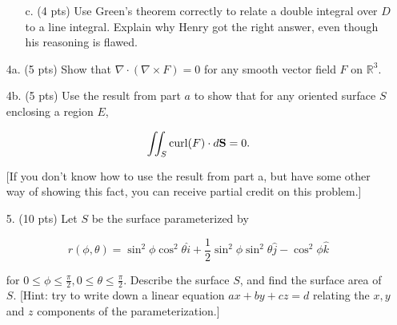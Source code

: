 \documentclass[12 pt]{report}
\begin{document}
\begin{enumerate}
\begin{enumerate}
\vspace{3cm} 

\item[c.] (4 pts) Use Green's theorem correctly to relate a double integral over $D$ to a line integral. Explain why Henry got the right answer, even though his reasoning is flawed. 



\end{enumerate} 

\newpage

\item[4a.] (5 pts) Show that $\nabla \cdot (\nabla \times F) = 0$ for any smooth vector field $F$ on $\mathbb{R}^3$.  

\vspace{10cm}

\item[4b.] (5 pts) Use the result from part $a$ to show that for any oriented surface $S$ enclosing a region $E$,

$$\iint_S \text{curl}(F) \cdot d\bold{S} = 0.$$ 

[If you don't know how to use the result from part a, but have some other way of showing this fact, you can receive partial credit on this problem.]

\newpage

\item[5.] (10 pts) Let $S$ be the surface parameterized by 

$$r(\phi, \theta) = \sin^2 \phi \cos^2 \theta \hat{i} + \frac{1}{2} \sin^2 \phi \sin^2\theta \hat{j}-\cos^2\phi\hat{k}$$

for $0 \leq \phi \leq \frac{\pi}{2}, 0 \leq \theta \leq \frac{\pi}{2}$. Describe the surface $S$, and find the surface area of $S$. [Hint: try to write down a linear equation $ax+by+cz = d$ relating the $x,y$ and $z$ components of the parameterization.]
\end{enumerate}
\end{document}
